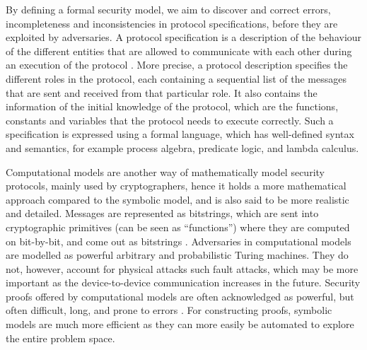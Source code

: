 By defining a formal security model, we aim to discover and correct errors, incompleteness and inconsistencies in protocol specifications, before they are exploited by adversaries. A protocol specification is a description of the behaviour of the different entities that are allowed to communicate with each other during an execution of the protocol \cite{cremers2005operational}. More precise, a protocol description specifies the different roles in the protocol, each containing a sequential list of the messages that are sent and received from that particular role. It also contains the information of the initial knowledge of the protocol, which are the functions, constants and variables that the protocol needs to execute correctly. Such a specification is expressed using a formal language, which has well-defined syntax and semantics, for example process algebra, predicate logic, and lambda calculus. 

Computational models are another way of mathematically model security protocols, mainly used by cryptographers, hence it holds a more mathematical approach compared to the symbolic model, and is also said to be more realistic and detailed. Messages are represented as bitstrings, which are sent into cryptographic primitives (can be seen as ``functions'') where they are computed on bit-by-bit, and come out as bitstrings \cite{blanchet2012security}. Adversaries in computational models are modelled as powerful arbitrary and probabilistic Turing machines. They do not, however, account for physical attacks such fault attacks, which may be more important as the device-to-device communication increases in the future. Security proofs offered by computational models are often acknowledged as powerful, but often difficult, long, and prone to errors \cite{cortier2011survey}. For constructing proofs, symbolic models are much more efficient as they can more easily be automated to explore the entire problem space.


